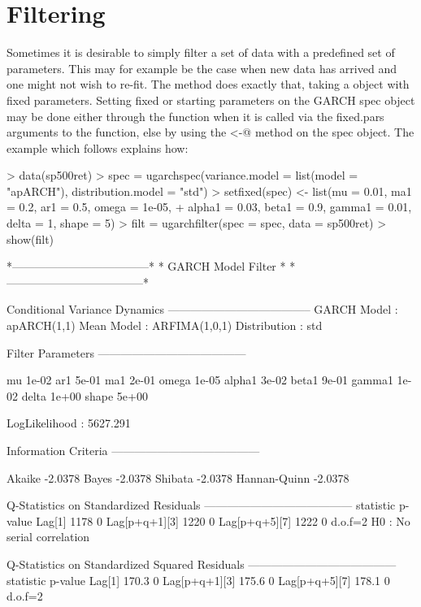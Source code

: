 \section{Filtering}\label{section:filtering}
Sometimes it is desirable to simply filter a set of data with a predefined set
of parameters. This may for example be the case when new data has arrived and
one might not wish to re-fit. The \verb@ugarchfilter@ method does exactly that,
taking a \verb@uGARCHspec@ object with fixed parameters. Setting fixed or
starting parameters on the GARCH spec object may be done either through the
\verb@ugarchspec@ function when it is called via the fixed.pars arguments to the
function, else by using the \verb@setfixed<-@ method on the spec object.
The example which follows explains how:
\begin{Schunk}
\begin{Sinput}
> data(sp500ret)
> spec = ugarchspec(variance.model = list(model = "apARCH"), distribution.model = "std")
> setfixed(spec) <- list(mu = 0.01, ma1 = 0.2, ar1 = 0.5, omega = 1e-05,
+     alpha1 = 0.03, beta1 = 0.9, gamma1 = 0.01, delta = 1, shape = 5)
> filt = ugarchfilter(spec = spec, data = sp500ret)
> show(filt)
\end{Sinput}
\begin{Soutput}
*------------------------------------*
*          GARCH Model Filter        *
*------------------------------------*

Conditional Variance Dynamics 	
--------------------------------------
GARCH Model	: apARCH(1,1)
Mean Model	: ARFIMA(1,0,1)
Distribution	: std

Filter Parameters
---------------------------------------

mu     1e-02
ar1    5e-01
ma1    2e-01
omega  1e-05
alpha1 3e-02
beta1  9e-01
gamma1 1e-02
delta  1e+00
shape  5e+00

LogLikelihood : 5627.291

Information Criteria
---------------------------------------

Akaike       -2.0378
Bayes        -2.0378
Shibata      -2.0378
Hannan-Quinn -2.0378

Q-Statistics on Standardized Residuals
---------------------------------------
              statistic p-value
Lag[1]             1178       0
Lag[p+q+1][3]      1220       0
Lag[p+q+5][7]      1222       0
d.o.f=2
H0 : No serial correlation

Q-Statistics on Standardized Squared Residuals
---------------------------------------
              statistic p-value
Lag[1]            170.3       0
Lag[p+q+1][3]     175.6       0
Lag[p+q+5][7]     178.1       0
d.o.f=2


\end{Soutput}
\end{Schunk}
